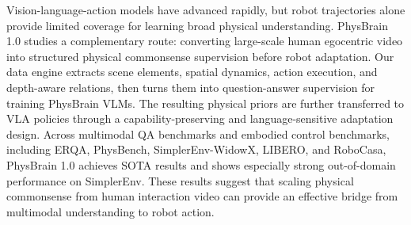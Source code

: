 Vision-language-action models have advanced rapidly, but robot trajectories alone provide limited coverage for learning broad physical understanding. PhysBrain 1.0 studies a complementary route: converting large-scale human egocentric video into structured physical commonsense supervision before robot adaptation. Our data engine extracts scene elements, spatial dynamics, action execution, and depth-aware relations, then turns them into question-answer supervision for training PhysBrain VLMs. The resulting physical priors are further transferred to VLA policies through a capability-preserving and language-sensitive adaptation design. Across multimodal QA benchmarks and embodied control benchmarks, including ERQA, PhysBench, SimplerEnv-WidowX, LIBERO, and RoboCasa, PhysBrain 1.0 achieves SOTA results and shows especially strong out-of-domain performance on SimplerEnv. These results suggest that scaling physical commonsense from human interaction video can provide an effective bridge from multimodal understanding to robot action.
